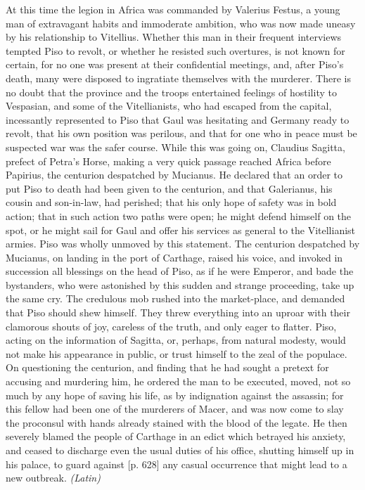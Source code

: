 At this time the legion in Africa was commanded by Valerius Festus, a young man of extravagant habits and immoderate ambition, who was now made uneasy by his relationship to Vitellius. Whether this man in their frequent interviews tempted Piso to revolt, or whether he resisted such overtures, is not known for certain, for no one was present at their confidential meetings, and, after Piso's death, many were disposed to ingratiate themselves with the murderer. There is no doubt that the province and the troops entertained feelings of hostility to Vespasian, and some of the Vitellianists, who had escaped from the capital, incessantly represented to Piso that Gaul was hesitating and Germany ready to revolt, that his own position was perilous, and that for one who in peace must be suspected war was the safer course. While this was going on, Claudius Sagitta, prefect of Petra's Horse, making a very quick passage reached Africa before Papirius, the centurion despatched by Mucianus. He declared that an order to put Piso to death had been given to the centurion, and that Galerianus, his cousin and son-in-law, had perished; that his only hope of safety was in bold action; that in such action two paths were open; he might defend himself on the spot, or he might sail for Gaul and offer his services as general to the Vitellianist armies. Piso was wholly unmoved by this statement. The centurion despatched by Mucianus, on landing in the port of Carthage, raised his voice, and invoked in succession all blessings on the head of Piso, as if he were Emperor, and bade the bystanders, who were astonished by this sudden and strange proceeding, take up the same cry. The credulous mob rushed into the market-place, and demanded that Piso should shew himself. They threw everything into an uproar with their clamorous shouts of joy, careless of the truth, and only eager to flatter. Piso, acting on the information of Sagitta, or, perhaps, from natural modesty, would not make his appearance in public, or trust himself to the zeal of the populace. On questioning the centurion, and finding that he had sought a pretext for accusing and murdering him, he ordered the man to be executed, moved, not so much by any hope of saving his life, as by indignation against the assassin; for this fellow had been one of the murderers of Macer, and was now come to slay the proconsul with hands already stained with the blood of the legate. He then severely blamed the people of Carthage in an edict which betrayed his anxiety, and ceased to discharge even the usual duties of his office, shutting himself up in his palace, to guard against [p. 628] any casual occurrence that might lead to a new outbreak. \emph{(Latin)}

